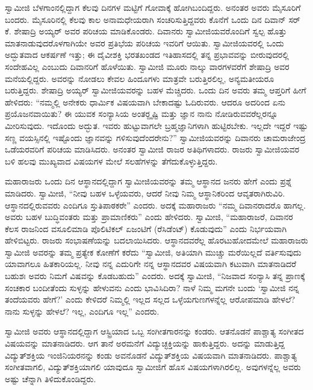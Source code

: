  ಸ್ವಾಮೀಜಿ ಬೆಳಗಾಂನಲ್ಲಿದ್ದಾಗ ಕೆಲವು ದಿನಗಳ ಮಟ್ಟಿಗೆ ಗೋವಾಕ್ಕೆ ಹೋಗಿಬಂದಿದ್ದರು. ಅನಂತರ ಅವರು ಮೈಸೂರಿಗೆ ಬಂದರು. ಮೈಸೂರಿನಲ್ಲಿ ಕೆಲವು ಕಾಲ ಅನಾಮಧೇಯರಾಗಿ ಸಂಚರಿಸುತ್ತಿದ್ದವರು ಕೊನೆಗೆ ಒಂದು ದಿನ ದಿವಾನ್ ಸರ್ ಕೆ. ಶೇಷಾದ್ರಿ ಅಯ್ಯರ್ ಅವರ ಪರಿಚಯ ಮಾಡಿಕೊಂಡರು. ದಿವಾನರು ಸ್ವಾಮೀಜಿಯವರೊಂದಿಗೆ ಸ್ವಲ್ಪ ಹೊತ್ತು ಮಾತನಾಡುವುದರೊಳಗಾಗಿಯೇ ಅವರ ಪ್ರತಿಭೆಯ ಪರಿಚಯ ಇವರಿಗೆ ಆಯಿತು. ಸ್ವಾಮೀಜಿಯವರಲ್ಲಿ ಒಂದು ಅದ್ಭುತವಾದ ಆಕರ್ಷಣೆ ಇತ್ತು; ಈ ದೈವೀಶಕ್ತಿ ಭರತಖಂಡದ ಇತಿಹಾಸದಲ್ಲಿ ತನ್ನ ಪ್ರಭಾವವನ್ನು ಬೀರುವುದರಲ್ಲಿ ಸಂದೇಹವಿಲ್ಲ ಎಂಬುದು ದಿವಾನರಿಗೆ ಹೊಳೆಯಿತು. ಸ್ವಾಮೀಜಿ ಮೂರು ನಾಲ್ಕು ವಾರಗಳವರೆಗೆ ಶೇಷಾದ್ರಿ ಅವರ ಮನೆಯಲ್ಲಿದ್ದರು. ಅವರನ್ನು ನೋಡಲು ಕೇವಲ ಹಿಂದೂಗಳು ಮಾತ್ರವೇ ಬರುತ್ತಿರಲಿಲ್ಲ, ಅನ್ಯಮತೀಯರೂ ಬರುತ್ತಿದ್ದರು. ಶೇಷಾದ್ರಿ ಅಯ್ಯರ್ ಸ್ವಾಮೀಜಿಯವರನ್ನು ಬಹಳ ಮೆಚ್ಚಿದರು. ಒಂದು ದಿನ ಅವರು ತಮ್ಮ ಆಪ್ತರಿಗೆ ಹೀಗೆ ಹೇಳಿದರು: “ನಮ್ಮಲ್ಲಿ ಅನೇಕರು ಧಾರ್ಮಿಕ ವಿಷಯವಾಗಿ ಬೇಕಾದಷ್ಟು ಓದಿರುವರು. ಆದರೂ ಅದರಿಂದ ಏನು ಪ್ರಯೊಜನವಾಯಿತು? ಈ ಯುವಕ ಸಂನ್ಯಾಸಿಯ ಅಂತರ್‍ದೃಷ್ಟಿ ಮತ್ತು ಜ್ಞಾನ ನಾನು ನೋಡಿರುವವರೆಲ್ಲರನ್ನೂ ಮೀರಿಸುವುದು. ಇದೊಂದು ಅದ್ಭುತ. ಇವರು ಹುಟ್ಟುವಾಗಲೇ ಬ್ರಹ್ಮಜ್ಞಾನಿಗಳಾಗಿ ಹುಟ್ಟಿರಬೇಕು. ಇಲ್ಲದೇ ಇದ್ದರೆ ಇಷ್ಟು ಸಣ್ಣ ವಯಸ್ಸಿನಲ್ಲಿ ಇಷ್ಟೊಂದು ಜ್ಞಾನವನ್ನು ಗಳಿಸುವುದೆಂದರೇನು?” ಸ್ವಾಮೀಜಿಯವರನ್ನು ದಿವಾನರು ಚಾಮರಾಜೇಂದ್ರ ಒಡೆಯರವರಿಗೆ ಪರಿಚಯ ಮಾಡಿಸಿದರು. ಅನಂತರ ಸ್ವಾಮೀಜಿ ರಾಜರ ಅತಿಥಿಗಳಾದರು. ರಾಜರು ಸ್ವಾಮೀಜಿಯವರ ಬಳಿ ಹಲವು ಮುಖ್ಯವಾದ ವಿಷಯಗಳ ಮೇಲೆ ಸಲಹೆಗಳನ್ನು ತೆಗೆದುಕೊಳ್ಳುತ್ತಿದ್ದರು. 

 ಮಹಾರಾಜರು ಒಂದು ದಿನ ಆಸ್ಥಾನದಲ್ಲಿದ್ದಾಗ ಸ್ವಾಮೀಜಿಯವರನ್ನು ತಮ್ಮ ಆಸ್ಥಾನದ ಜನರು ಹೇಗೆ ಎಂದು ಪ್ರಶ್ನೆ ಮಾಡಿದರು. ಸ್ವಾಮೀಜಿ, “ನೀವು ಬಹಳ ಒಳ್ಳೆಯವರು, ಆದರೆ ನೀವು ನಿಮ್ಮ ಆಸ್ಥಾನಿಕರಿಂದ ಆವೃತರಾಗಿರುವಿರಿ. ಆಸ್ಥಾನದಲ್ಲಿರುವವರು ಎಂದಿಗೂ ಸ್ತುತಿಪಾಠಕರೇ” ಎಂದರು. ಅದಕ್ಕೆ ಮಹಾರಾಜರು “ನಮ್ಮ ದಿವಾನರಾದರೊ ಹಾಗಲ್ಲ. ಅವರು ಬಹಳ ಬುದ್ಧಿವಂತರು ಮತ್ತು ಪ್ರಾಮಾಣಿಕರು” ಎಂದು ಹೇಳಿದರು. ಸ್ವಾಮೀಜಿ, “ಮಹಾರಾಜರೆ, ದಿವಾನರ ಕೆಲಸ ರಾಜನಿಂದ ವಸೂಲಿಮಾಡಿ ಪೊಲಿಟಿಕಲ್ ಏಜಂಟಿಗೆ (ರೆಸಿಡೆಂಟ್) ಕೊಡುವುದು” ಎಂದು ನಿರ್ಭಯವಾಗಿ ಹೇಳಿಬಿಟ್ಟರು. ರಾಜರು ಸಂಭಾಷಣೆಯನ್ನು ಬದಲಾಯಿಸಿದರು. ಆಸ್ಥಾನದವರೆಲ್ಲ ಹೊರಟುಹೋದಮೇಲೆ ಮಹಾರಾಜರು ಸ್ವಾಮೀಜಿ ಅವರನ್ನು ತಮ್ಮ ಪ್ರತ್ಯೇಕ ಕೋಣೆಗೆ ಕರೆದು “ಸ್ವಾಮೀಜಿ, ಅತಿಯಾಗಿ ಮುಚ್ಚು ಮರೆಯಿಲ್ಲದೆ ವರ್ತಿಸುವುದು ಯಾವಾಗಲೂ ಹಿತಕಾರಿಯಲ್ಲ. ನೀವು ನನ್ನ ಎದುರಿಗೇ ನನ್ನ ಆಸ್ಥಾನದವರ ವಿಷಯವಾಗಿ ಕಟುವಾಗಿ ಮಾತನಾಡಿದರೆ ಬಹುಶಃ ಅವರು ನಿಮಗೆ ವಿಷವನ್ನು ಕೊಡಬಹುದು” ಎಂದರು. ಅದಕ್ಕೆ ಸ್ವಾಮೀಜಿ, “ನಿಜವಾದ ಸಂನ್ಯಾಸಿ ತನ್ನ ಪ್ರಾಣಕ್ಕೆ ಸಂಚಕಾರ ಬಂದೀತೆಂದು ಸುಳ್ಳನ್ನು ಹೇಳುವನು ಎಂದು ಭಾವಿಸಿದಿರಾ? ನಾಳೆ ನಿಮ್ಮ ಮಗನೇ ಬಂದು ‘ಸ್ವಾಮೀಜಿ ನನ್ನ ತಂದೆಯವರು ಹೇಗೆ?’ ಎಂದು ಕೇಳಿದರೆ ನಿಮ್ಮಲ್ಲಿ ಇಲ್ಲದ ಸಲ್ಲದ ಒಳ್ಳೆಯ\break ಗುಣಗಳನ್ನೆಲ್ಲ ಆರೋಪಮಾಡಿ ಹೇಳಲೆ? ನಾನು ಸುಳ್ಳನ್ನು ಹೇಳಲೆ? ಇಲ್ಲ, ಎಂದಿಗೂ ಇಲ್ಲ” ಎಂದರು. 

 ಸ್ವಾಮೀಜಿ ಅವರು ಆಸ್ಥಾನದಲ್ಲಿದ್ದಾಗ ಆಸ್ಟ್ರಿಯಾದ ಒಬ್ಬ ಸಂಗೀತಗಾರನನ್ನು ಕಂಡರು. ಆತನೊಡನೆ ಪಾಶ್ಚಾತ್ಯ ಸಂಗೀತದ ವಿಷಯವನ್ನು ಮಾತನಾಡಿದರು. ಆಗ ತಾನೆ ಅರಮನೆಗೆ ವಿದ್ಯುಚ್ಛಕ್ತಿಯನ್ನು ಹಾಕುತ್ತಿದ್ದರು. ಅದನ್ನು ಮಾಡುತ್ತಿದ್ದ ವಿದ್ಯುತ್‍ಶಕ್ತಿಯ ಇಂಜಿನಿಯರನನ್ನು ಕಂಡು ಅವನೊಡನೆ ವಿದ್ಯುತ್‍ಶಕ್ತಿಯ ವಿಷಯವಾಗಿ ಮಾತನಾಡಿದರು. ಪಾಶ್ಚಾತ್ಯ ಸಂಗೀತವಾಗಲಿ, ವಿದ್ಯುತ್‍ಶಕ್ತಿಯಾಗಲಿ ಯಾವುದೂ ಸ್ವಾಮೀಜಿಗೆ ಹೊಸ ವಿಷಯಗಳಾಗಿರಲಿಲ್ಲ. ಅವುಗಳನ್ನೆಲ್ಲ ಅವರು ಅಷ್ಟು ಚೆನ್ನಾಗಿ ತಿಳಿದುಕೊಂಡಿದ್ದರು. 

